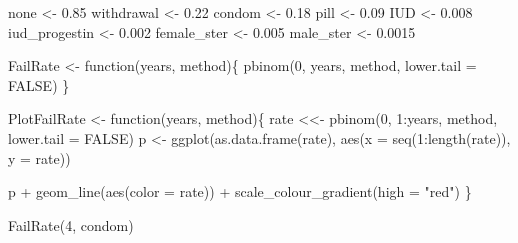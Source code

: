 \documentclass[
  letterpaper,
  DIV=11,
  numbers=noendperiod]{scrartcl}
\newenvironment{Shaded}{\begin{snugshade}}{\end{snugshade}}
\newcommand{\AttributeTok}[1]{\textcolor[rgb]{0.40,0.46,0.14}{#1}}
\newcommand{\ConstantTok}[1]{\textcolor[rgb]{0.56,0.35,0.01}{#1}}
\newcommand{\ControlFlowTok}[1]{\textcolor[rgb]{0.00,0.46,0.62}{#1}}
\newcommand{\DecValTok}[1]{\textcolor[rgb]{0.68,0.00,0.00}{#1}}
\newcommand{\FloatTok}[1]{\textcolor[rgb]{0.68,0.00,0.00}{#1}}
\newcommand{\FunctionTok}[1]{\textcolor[rgb]{0.28,0.35,0.67}{#1}}
\newcommand{\NormalTok}[1]{\textcolor[rgb]{0.00,0.46,0.62}{#1}}
\newcommand{\OtherTok}[1]{\textcolor[rgb]{0.00,0.46,0.62}{#1}}
\newcommand{\SpecialCharTok}[1]{\textcolor[rgb]{0.37,0.37,0.37}{#1}}
\newcommand{\StringTok}[1]{\textcolor[rgb]{0.13,0.47,0.30}{#1}}
\begin{document}
\begin{Shaded}
\begin{Highlighting}[]
\NormalTok{none }\OtherTok{\textless{}{-}} \FloatTok{0.85}
\NormalTok{withdrawal }\OtherTok{\textless{}{-}} \FloatTok{0.22}
\NormalTok{condom }\OtherTok{\textless{}{-}} \FloatTok{0.18}
\NormalTok{pill }\OtherTok{\textless{}{-}} \FloatTok{0.09}
\NormalTok{IUD }\OtherTok{\textless{}{-}} \FloatTok{0.008}
\NormalTok{iud\_progestin }\OtherTok{\textless{}{-}} \FloatTok{0.002}
\NormalTok{female\_ster }\OtherTok{\textless{}{-}} \FloatTok{0.005}
\NormalTok{male\_ster }\OtherTok{\textless{}{-}} \FloatTok{0.0015}
\end{Highlighting}
\end{Shaded}

\begin{Shaded}
\begin{Highlighting}[]
\NormalTok{FailRate }\OtherTok{\textless{}{-}} \ControlFlowTok{function}\NormalTok{(years, method)\{}
     \FunctionTok{pbinom}\NormalTok{(}\DecValTok{0}\NormalTok{, years, method, }\AttributeTok{lower.tail =} \ConstantTok{FALSE}\NormalTok{)}
\NormalTok{\}}

\NormalTok{PlotFailRate }\OtherTok{\textless{}{-}} \ControlFlowTok{function}\NormalTok{(years, method)\{}
\NormalTok{     rate }\OtherTok{\textless{}\textless{}{-}} \FunctionTok{pbinom}\NormalTok{(}\DecValTok{0}\NormalTok{, }\DecValTok{1}\SpecialCharTok{:}\NormalTok{years, method, }\AttributeTok{lower.tail =} \ConstantTok{FALSE}\NormalTok{)}
\NormalTok{     p }\OtherTok{\textless{}{-}} \FunctionTok{ggplot}\NormalTok{(}\FunctionTok{as.data.frame}\NormalTok{(rate), }\FunctionTok{aes}\NormalTok{(}\AttributeTok{x =} \FunctionTok{seq}\NormalTok{(}\DecValTok{1}\SpecialCharTok{:}\FunctionTok{length}\NormalTok{(rate)), }\AttributeTok{y =}\NormalTok{ rate))}

\NormalTok{     p }\SpecialCharTok{+}
     \FunctionTok{geom\_line}\NormalTok{(}\FunctionTok{aes}\NormalTok{(}\AttributeTok{color =}\NormalTok{ rate)) }\SpecialCharTok{+}
     \FunctionTok{scale\_colour\_gradient}\NormalTok{(}\AttributeTok{high =} \StringTok{"red"}\NormalTok{)}
\NormalTok{\}}
\end{Highlighting}
\end{Shaded}

\begin{Shaded}
\begin{Highlighting}[]
\FunctionTok{FailRate}\NormalTok{(}\DecValTok{4}\NormalTok{, condom)}
\end{Highlighting}
\end{Shaded}
\end{document}
